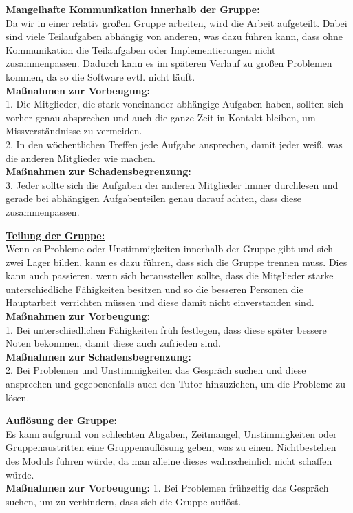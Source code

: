 \documentclass[fontsize=12pt,paper=a4,twoside]{scrartcl}
\begin{document}
\bigskip

\textbf{\underline{Mangelhafte Kommunikation innerhalb der Gruppe:}}\\
Da wir in einer relativ großen Gruppe arbeiten, wird die Arbeit aufgeteilt. Dabei sind viele Teilaufgaben abhängig von anderen, was dazu führen kann, dass ohne Kommunikation die Teilaufgaben oder Implementierungen nicht zusammenpassen. Dadurch kann es im späteren Verlauf zu großen Problemen kommen, da so die Software evtl. nicht läuft.\\
\textbf{Maßnahmen zur Vorbeugung:}\\
1. Die Mitglieder, die stark voneinander abhängige Aufgaben haben, sollten sich vorher genau absprechen und auch die ganze Zeit in Kontakt bleiben, um Missverständnisse zu vermeiden.\\
2. In den wöchentlichen Treffen jede Aufgabe ansprechen, damit jeder weiß, was die anderen Mitglieder wie machen.\\
\textbf{Maßnahmen zur Schadensbegrenzung:}\\
3. Jeder sollte sich die Aufgaben der anderen Mitglieder immer durchlesen und gerade bei abhängigen Aufgabenteilen genau darauf achten, dass diese zusammenpassen.\\

\bigskip

\textbf{\underline{Teilung der Gruppe:}}\\
Wenn es Probleme oder Unstimmigkeiten innerhalb der Gruppe gibt und sich zwei Lager bilden, kann es dazu führen, dass sich die Gruppe trennen muss. Dies kann auch passieren, wenn sich herausstellen sollte, dass die Mitglieder starke unterschiedliche Fähigkeiten besitzen und so die besseren Personen die Hauptarbeit verrichten müssen und diese damit nicht einverstanden sind.\\
\textbf{Maßnahmen zur Vorbeugung:}\\
1. Bei unterschiedlichen Fähigkeiten früh festlegen, dass diese später bessere Noten bekommen, damit diese auch zufrieden sind.\\
\textbf{Maßnahmen zur Schadensbegrenzung:}\\
2. Bei Problemen und Unstimmigkeiten das Gespräch suchen und diese ansprechen und gegebenenfalls auch den Tutor hinzuziehen, um die Probleme zu lösen.\\

\bigskip

\textbf{\underline{Auflösung der Gruppe:}}\\
Es kann aufgrund von schlechten Abgaben, Zeitmangel, Unstimmigkeiten oder Gruppenaustritten eine Gruppenauflösung geben, was zu einem Nichtbestehen des Moduls führen würde, da man alleine dieses wahrscheinlich nicht schaffen würde. \\
\textbf{Maßnahmen zur Vorbeugung:}
1. Bei Problemen frühzeitig das Gespräch suchen, um zu verhindern, dass sich die Gruppe auflöst.\\
\end{document}
